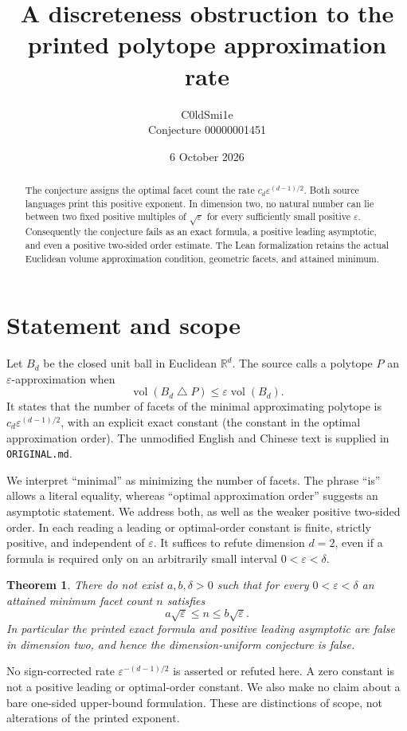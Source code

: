 \documentclass[11pt,letterpaper]{article}
\title{A discreteness obstruction to the printed polytope approximation rate}
\author{C0ldSmi1e\\\small Conjecture 00000001451}
\date{6 October 2026}
\newtheorem{theorem}{Theorem}
\newcommand{\R}{\mathbb{R}}
\newcommand{\vol}{\operatorname{vol}}
\newcommand{\code}[1]{\texttt{\small #1}}
\begin{document}
\maketitle
\begin{abstract}
The conjecture assigns the optimal facet count the rate
$c_d\varepsilon^{(d-1)/2}$. Both source languages print this positive
exponent. In dimension two, no natural number can lie between two fixed
positive multiples of $\sqrt\varepsilon$ for every sufficiently small
positive $\varepsilon$. Consequently the conjecture fails as an exact
formula, a positive leading asymptotic, and even a positive two-sided
order estimate. The Lean formalization retains the actual Euclidean
volume approximation condition, geometric facets, and attained minimum.
\end{abstract}

\section{Statement and scope}
Let $B_d$ be the closed unit ball in Euclidean $\R^d$. The source calls a
polytope $P$ an $\varepsilon$-approximation when
\[
 \vol(B_d\mathbin{\triangle}P)\leq\varepsilon\vol(B_d).
\]
It states that the number of facets of the minimal approximating
polytope is $c_d\varepsilon^{(d-1)/2}$, with an explicit exact constant
(the constant in the optimal approximation order).
The unmodified English and Chinese text is supplied in \code{ORIGINAL.md}.

We interpret ``minimal'' as minimizing the number of facets. The phrase
``is'' allows a literal equality, whereas ``optimal approximation order''
suggests an asymptotic statement. We address both, as well as the weaker
positive two-sided order. In each reading a leading or optimal-order
constant is finite, strictly positive, and independent of $\varepsilon$.
It suffices to refute dimension $d=2$, even if a formula is required only
on an arbitrarily small interval $0<\varepsilon<\delta$.

\begin{theorem}\label{thm:main}
There do not exist $a,b,\delta>0$ such that for every
$0<\varepsilon<\delta$ an attained minimum facet count $n$ satisfies
\[
 a\sqrt\varepsilon\leq n\leq b\sqrt\varepsilon.
\]
In particular the printed exact formula and positive leading asymptotic
are false in dimension two, and hence the dimension-uniform conjecture
is false.
\end{theorem}

No sign-corrected rate $\varepsilon^{-(d-1)/2}$ is asserted or refuted
here. A zero constant is not a positive leading or optimal-order
constant. We also make no claim about a bare one-sided upper-bound
formulation. These are distinctions of scope, not alterations of the
printed exponent.
\end{document}
